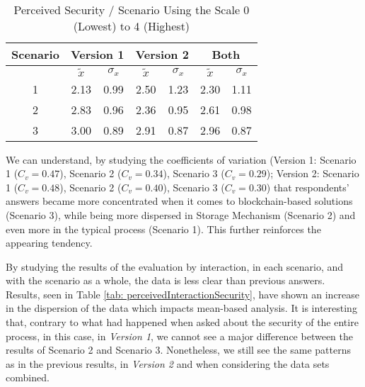 \begin{table}[htb]
	\centering
	\caption{Perceived Security / Scenario Using the Scale 0 (Lowest) to 4 (Highest)}
	\label{tab: perceivedSecurity}
	\begin{tabular}{c|cc|cc|cc}
		\hline
		Scenario & \multicolumn{2}{c}{\bf Version 1} \vrule & \multicolumn{2}{c}{\bf Version 2} \vrule & \multicolumn{2}{c}{\bf Both}                                             \\
		\hline
		         & $\tilde{x}$                              & $\sigma_{x}$                             & $\tilde{x}$                  & $\sigma_{x}$ & $\tilde{x}$ & $\sigma_{x}$ \\
		\hline
		1        & 2.13                                     & 0.99                                     & 2.50                         & 1.23         & 2.30        & 1.11         \\
		\hline
		2        & 2.83                                     & 0.96                                     & 2.36                         & 0.95         & 2.61        & 0.98         \\
		\hline
		3        & 3.00                                     & 0.89                                     & 2.91                         & 0.87         & 2.96        & 0.87         \\
		\hline
	\end{tabular}
\end{table}

We can understand, by studying the coefficients of variation (Version 1: Scenario 1 ($C_v = 0.47$), Scenario 2 ($C_v = 0.34$), Scenario 3 ($C_v = 0.29$); Version 2: Scenario 1 ($C_v = 0.48$), Scenario 2 ($C_v = 0.40$), Scenario 3 ($C_v = 0.30$) that respondents' answers became more concentrated when it comes to blockchain-based solutions (Scenario 3), while being more dispersed in Storage Mechanism (Scenario 2) and even more in the typical process (Scenario 1). This further reinforces the appearing tendency.

By studying the results of the evaluation by interaction, in each scenario, and with the scenario as a whole, the data is less clear than previous answers. Results, seen in Table \ref{tab: perceivedInteractionSecurity}, have shown an increase in the dispersion of the data which impacts mean-based analysis. It is interesting that, contrary to what had happened when asked about the security of the entire process, in this case, in \textit{Version 1}, we cannot see a major difference between the results of Scenario 2 and Scenario 3. Nonetheless, we still see the same patterns as in the previous results, in \textit{Version 2} and when considering the data sets combined.

